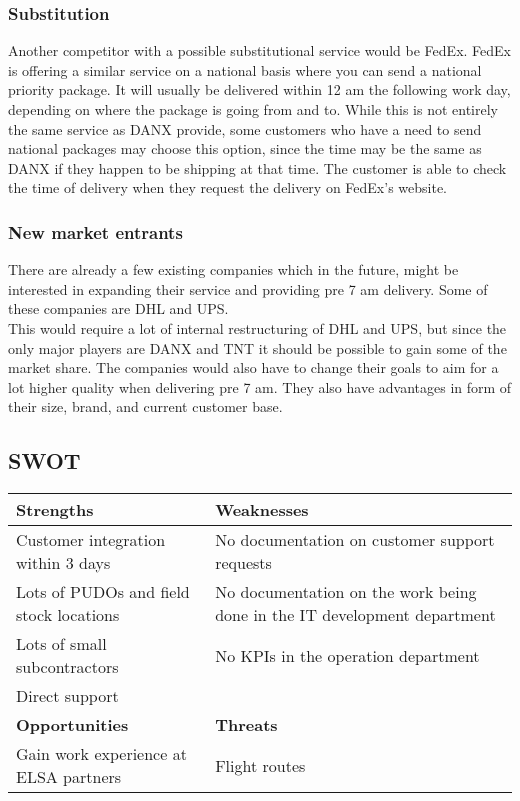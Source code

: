 \subsubsection{Substitution}
Another competitor with a possible substitutional service would be FedEx.\cite{webpage004} FedEx is offering a similar service on a national basis where you can send a national priority package. It will usually be delivered within 12 am the following work day, depending on where the package is going from and to. While this is not entirely the same service as DANX provide, some customers who have a need to send national packages may choose this option, since the time may be the same as DANX if they happen to be shipping at that time. The customer is able to check the time of delivery when they request the delivery on FedEx’s website.\cite{webpage011}

\subsubsection{New market entrants}
There are already a few existing companies which in the future, might be interested in expanding their service and providing pre 7 am delivery. Some of these companies are DHL and UPS.\\
This would require a lot of internal restructuring of DHL and UPS, but since the only major players are DANX and TNT it should be possible to gain some of the market share. The companies would also have to change their goals to aim for a lot higher quality when delivering pre 7 am. They also have advantages in form of their size, brand, and current customer base.

\subsection{SWOT}
\begin{tabular}{| p{} | p{} |}
\hline
\rowcolor{GR}
\textbf{Strengths} & \textbf{Weaknesses} \\ \hline
Customer integration within 3 days \cite{lasse008} & No documentation on customer support requests\cite{gert012} \\ \hline
Lots of PUDOs and field stock locations\cite{img001} & No documentation on the work being done in the IT\cite{lasse007} development department\\ \hline
Lots of small subcontractors\cite{img001}\cite{gert021} & No KPIs in the operation department\cite{gert011} \\ \hline
Direct support\cite{lasse012} & \\ \hline \hline
\rowcolor{GR}
\textbf{Opportunities} & \textbf{Threats} \\ \hline
Gain work experience at ELSA partners \cite{gert010}& Flight routes\cite{gert021} \\ \hline
\end{tabular}
\qquad

